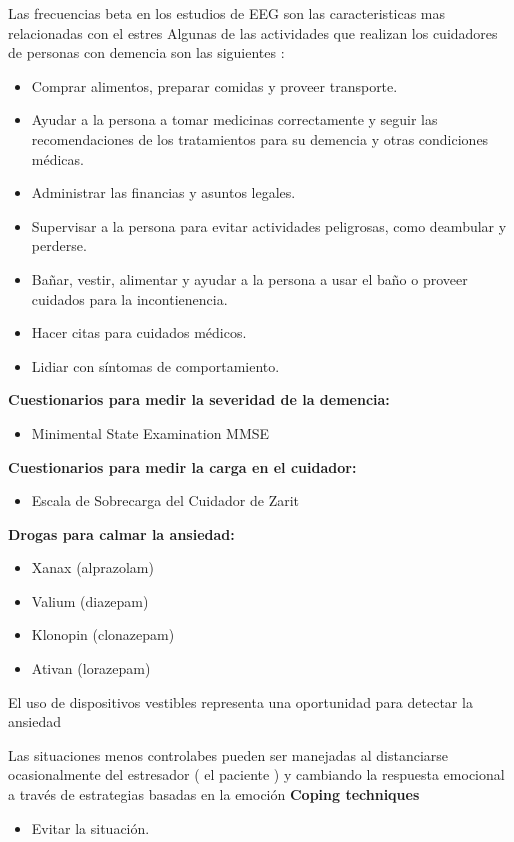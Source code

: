 \documentclass[letterpaper,12pt]{cicese}
\begin{document}
		Las frecuencias beta en los estudios de EEG son las caracteristicas mas relacionadas con el estres \citep{Sharma20121287}
		Algunas de las actividades que realizan los cuidadores de personas con demencia son las siguientes \citep{tagkey2008110}: 
		\begin{itemize}
			\item Comprar alimentos, preparar comidas y proveer transporte.
			\item Ayudar a la persona a tomar medicinas correctamente y seguir las recomendaciones de los tratamientos para su demencia y otras condiciones m\'edicas.
			\item Administrar las financias y asuntos legales.
			\item Supervisar a la persona para evitar actividades peligrosas, como deambular y perderse.	
			\item Ba\~nar, vestir, alimentar y ayudar a la persona a usar el ba\~no o proveer cuidados para la incontienencia.
			\item Hacer citas para cuidados m\'edicos.
			\item Lidiar con s\'intomas de comportamiento.

		\end{itemize}
		\textbf{Cuestionarios para medir la severidad de la demencia:}
		\begin{itemize}

			\item Minimental State Examination MMSE

		\end{itemize}
		\textbf{Cuestionarios para medir la carga en el cuidador:}
		\begin{itemize}

			\item Escala de Sobrecarga del Cuidador de Zarit

		\end{itemize}
		\textbf{Drogas para calmar la ansiedad:}
		\begin{itemize}
			\item Xanax (alprazolam)
			\item Valium (diazepam)
			\item Klonopin (clonazepam)
			\item Ativan (lorazepam)
		\end{itemize}

	El uso de dispositivos vestibles representa una oportunidad para detectar la ansiedad \citep{Miranda:2014:ADU:2676690.2676694}
	
	Las situaciones menos controlabes pueden ser manejadas al distanciarse ocasionalmente del estresador ( el paciente )  y cambiando la respuesta emocional a trav\'es de estrategias basadas en la emoci\'on
	\textbf{Coping techniques}

	\citep{li20121}
	\begin{itemize}
		\item Evitar la situaci\'on.
	\end{itemize}
        {\normalsize
		
                
        }


	
\end{document}
